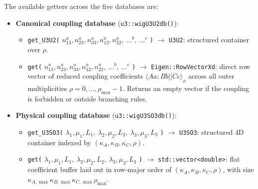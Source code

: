 \documentclass[aps,onecolumn,10pt,superscriptaddress,floatfix,nofootinbib]{revtex4}
\begin{document}
The available getters across the five databases are:
\begin{itemize}
    \item \textbf{Canonical coupling database} (\verb|u3::wigU3U2db()|):
    \begin{itemize}
        \item \verb|get_U3U2(| $n_{13}^a,n_{23}^a,n_{33}^a,n_{12}^a,n_{22}^a,\ \dots^b,\ \dots^c$ \verb|)| $\to$ \verb|U3U2|: structured container over $\rho$.
        \item \verb|get(| $n_{13}^a,n_{23}^a,n_{33}^a,n_{12}^a,n_{22}^a,\ \dots^b,\ \dots^c$ \verb|)| $\to$ \verb|Eigen::RowVectorXd|: direct row vector of reduced coupling coefficients $\langle A a; B b || C c \rangle_\rho$ across all outer multiplicities $\rho = 0,\dots,\rho_{\max}-1$. Returns an empty vector if the coupling is forbidden or outside branching rules.

    \end{itemize}

    \item \textbf{Physical coupling database} (\verb|u3::wigU3SO3db()|):
    \begin{itemize}
        \item \verb|get_U3SO3(| $\lambda_1,\mu_1,L_1,\ \lambda_2,\mu_2,L_2,\ \lambda_3,\mu_3,L_3$ \verb|)| $\to$ \verb|U3SO3|: structured 4D container indexed by $(\kappa_A,\kappa_B,\kappa_C,\rho)$.
        \item \verb|get(| $\lambda_1,\mu_1,L_1,\ \lambda_2,\mu_2,L_2,\ \lambda_3,\mu_3,L_3$ \verb|)| $\to$ \verb|std::vector<double>|: flat coefficient buffer laid out in row-major order of $(\kappa_A,\kappa_B,\kappa_C,\rho)$, with size $\kappa_{A,\max}\kappa_{B,\max}\kappa_{C,\max}\rho_{\max}$.
    \end{itemize}


\end{itemize}
\end{document}
